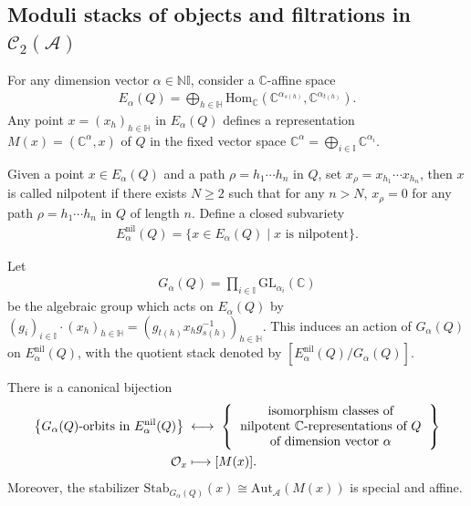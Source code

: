 \documentclass[12pt]{amsart}
\theoremstyle{definition}
\numberwithin{equation}{section}
\begin{document}
\subsection{Moduli stacks of objects and filtrations in \texorpdfstring{$ \mathcal{C}_2(\mathcal{A}) $}{C2A}}\;
\label{Moduli stacks of objects and filtrations in C2A}

For any dimension vector $ \alpha \in \mathbb{N}\mathbb{I} $, consider a $ \mathbb{C} $-affine space
\begin{align*}
    E_{\alpha}(Q) = \bigoplus_{h\in \mathbb{H}}\mathrm{Hom}_{\mathbb{C}}(\mathbb{C}^{\alpha_{s(h)}},\mathbb{C}^{\alpha_{t(h)}}).
\end{align*}
Any point $ x=(x_{h})_{h \in \mathbb{H}} $ in $ E_{\alpha}(Q) $ defines a representation $  M(x) = (\mathbb{C}^{\alpha}, x) $ of $ Q $ in the fixed vector space $ \mathbb{C}^{\alpha} = \bigoplus_{i \in \mathbb{I}}\mathbb{C}^{{\alpha}_i} $. 

Given a point $ x \in E_{\alpha}(Q) $ and a path $ \rho=h_1 \cdots h_n $ in $ Q $, set $ x_{\rho} = x_{h_1} \cdots x_{h_n} $, then $ x $ is called nilpotent if there exists $ N \geqslant 2 $ such that for any $ n > N $, $ x_{\rho} = 0 $ for any path $ \rho = h_1 \cdots h_n $ in $ Q $  of length $ n $.
Define a closed subvariety
\begin{align*}
     E_{\alpha}^{\mathrm{nil}}(Q) = \{x\in E_{\alpha}(Q)\mid x \text{ is nilpotent} \}.
\end{align*}

Let
\begin{align*}
    G_{\alpha}(Q) = \prod_{i \in \mathbb{I}} \mathrm{GL}_{\alpha_i}(\mathbb{C})
\end{align*}
be the algebraic group which acts on $ E_{\alpha}(Q) $ by $ (g_i)_{i \in \mathbb{I}} \cdot (x_{h})_{h \in \mathbb{H}} = (g_{t(h)} x_{h} g_{s(h)}^{-1})_{h \in \mathbb{H}} $. 
This induces an action of $ G_{\alpha}(Q) $ on $ E_{\alpha}^{\mathrm{nil}}(Q) $, with the quotient stack denoted by $ [E_{\alpha}^{\mathrm{nil}}(Q)/G_{\alpha}(Q)] $.

There is a canonical bijection
\begin{align*}
\left\{
  G_{\alpha}(Q)\text{-orbits in }E_{\alpha}^{\mathrm{nil}}(Q)
\right\}
\;&\longleftrightarrow\;
    \left\{
  \begin{tabular}{c}
      isomorphism classes of   \\
      nilpotent $\mathbb{C}$-representations of $ Q $ \\
      of dimension vector $ \alpha $
  \end{tabular}
\right\}\\
\mathcal{O}_x &\longmapsto [M(x)].
\end{align*}
Moreover, the stabilizer $ \mathrm{Stab}_{G_{\alpha}(Q)}(x) \cong \mathrm{Aut}_{\mathcal{A}} (M(x)) $ is special and affine.
\end{document}
